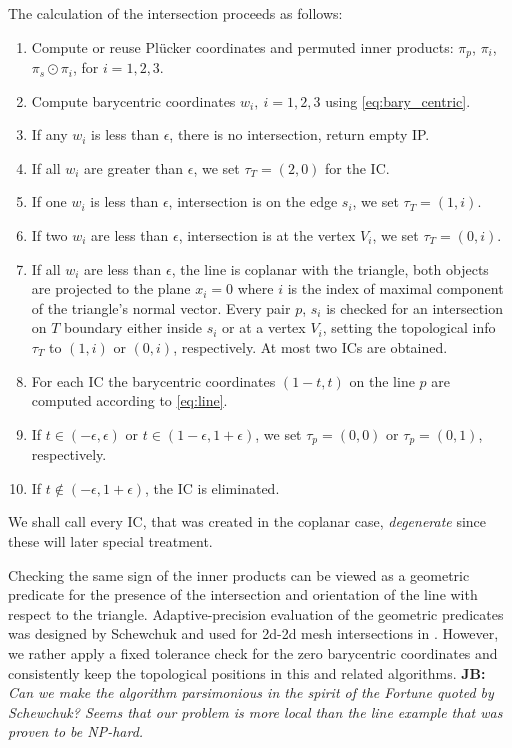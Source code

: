 \documentclass{elsarticle}
\newcommand{\noteJB}[1]{{\color{Blue} \textbf{JB: } \textit{#1}}}
\newcommand{\plucker}{Pl\"{u}cker }
\begin{document}
The calculation of the intersection proceeds as follows:
\begin{enumerate}
    \item Compute or reuse \plucker coordinates and permuted inner products: $\pi_p$, $\pi_i$, $\pi_s \odot \pi_i$, for $i=1,2,3$.
    \item Compute barycentric coordinates $w_i,\ i=1,2,3$ using \eqref{eq:bary_centric}.
    \item If any $w_i$ is less than $\epsilon$, there is no intersection, return empty IP.  
    \item If all $w_i$ are greater than $\epsilon$, we set $\tau_T = (2, 0)$ for the IC.
    \item If one $w_i$ is less than $\epsilon$, intersection is on the edge $s_i$, we set $\tau_T =(1,i)$.
    \item If two $w_i$ are less than $\epsilon$, intersection is at the vertex $V_i$, we set $\tau_T=(0,i)$.
    \item \label{item:coplanar} If all $w_i$ are less than $\epsilon$, the line is coplanar with the triangle, both objects are 
        projected to the plane $x_i=0$ where $i$ is the index of maximal component of the triangle's normal vector.
        Every pair $p$, $s_i$ is checked for an intersection on $T$ boundary either inside $s_i$ or at a vertex $V_i$, setting the topological info $\tau_T$ to 
        $(1, i)$ or $(0, i)$, respectively. At most two ICs are obtained.
    \item For each IC the barycentric coordinates $(1-t, t)$ on the line $p$ are computed according to \eqref{eq:line}. 
    \item If $t\in (-\epsilon, \epsilon)$ or $t\in (1-\epsilon, 1+\epsilon)$, we set $\tau_p = (0,0)$ or $\tau_p = (0,1)$, respectively.
    \item If $t\notin (-\epsilon, 1+\epsilon)$, the IC is eliminated.
\end{enumerate}

We shall call every IC, that was created in the coplanar case, \emph{degenerate} since these will later
special treatment.

Checking the same sign of the inner products can be viewed as a geometric predicate for the presence of the intersection and orientation of the 
line with respect to the triangle. Adaptive-precision evaluation of the geometric predicates was designed by Schewchuk \cite{shewchuk_adaptive_1997}
and used for 2d-2d mesh intersections in \cite{elsheikh_reliable_2012}. However, we rather apply a fixed tolerance check for the zero 
barycentric coordinates and consistently keep the topological positions in this and related algorithms. \noteJB{Can we make the algorithm 
\emph{parsimonious} in the spirit of the Fortune \cite{fortune_stable_1989} quoted by Schewchuk? 
Seems that our problem is more local than the line example that was proven to be NP-hard.}
\end{document}
